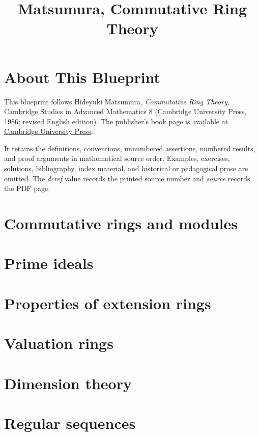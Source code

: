 

\title{Matsumura, Commutative Ring Theory}
\author{}
\date{}
\maketitle

\chapter*{About This Blueprint}
This blueprint follows Hideyuki Matsumura, \emph{Commutative Ring Theory},
Cambridge Studies in Advanced Mathematics 8 (Cambridge University Press,
1986; revised English edition).  The publisher's book page is available at
\href{https://doi.org/10.1017/CBO9781139171762}{Cambridge University Press}.

It retains the definitions, conventions, unnumbered assertions, numbered
results, and proof arguments in mathematical source order.  Examples,
exercises, solutions, bibliography, index material, and historical or
pedagogical prose are omitted.  The \emph{dcref} value records the printed
source number and \emph{source} records the PDF page.

\tableofcontents
\chapter{Commutative rings and modules}\label{mcrt-ch1}
\chapter{Prime ideals}\label{mcrt-ch2}
\chapter{Properties of extension rings}\label{mcrt-ch3}
\chapter{Valuation rings}\label{mcrt-ch4}
\chapter{Dimension theory}\label{mcrt-ch5}
\chapter{Regular sequences}\label{mcrt-ch6}


